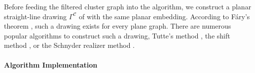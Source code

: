 Before feeding the filtered cluster graph \clustergraph{} into the algorithm, we construct a planar straight-line drawing $\Gamma^\mathcal{C}$ of \clustergraph{} with the same planar embedding.
According to Fáry's theorem \cite{fary1948straight} \cite{wagner1936bemerkungen} \cite{stein1951convex}, such a drawing exists for every plane graph.
There are numerous popular algorithms to construct such a drawing, \eg{} Tutte's method \cite{tutte1963draw}, the shift method \cite{fraysseix1990draw}, or the Schnyder realizer method \cite{schnyder1990embedding}.



\clearpage
\paragraph{Algorithm Implementation}

